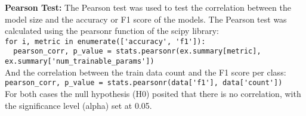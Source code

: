 \textbf{Pearson Test:} The Pearson test was used to test the correlation between the model size and the accuracy
or F1 score of the models. The Pearson test was calculated using the pearsonr function of the scipy library:\\
\lstinline{for i, metric in enumerate(['accuracy', 'f1']):}\\
\lstinline{  pearson_corr, p_value = stats.pearsonr(ex.summary[metric], ex.summary['num_trainable_params'])}\\
And the correlation between the train data count and the F1 score per class:\\
\lstinline{pearson_corr, p_value = stats.pearsonr(data['f1'], data['count'])}\\
For both cases the null hypothesis (H0) posited that there is no correlation, with the significance level (alpha) set at 0.05.




